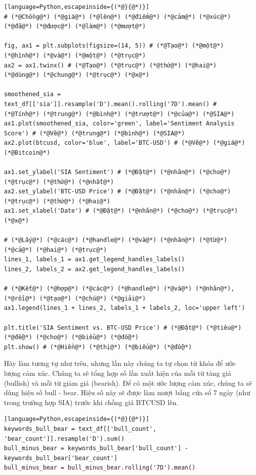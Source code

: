 \begin{lstlisting}[language=Python,escapeinside={(*@}{@*)}]
# (*@Chồng@*) (*@giá@*) (*@lên@*) (*@điểm@*) (*@cảm@*) (*@xúc@*) (*@đã@*) (*@được@*) (*@làm@*) (*@mượt@*)

fig, ax1 = plt.subplots(figsize=(14, 5)) # (*@Tạo@*) (*@một@*) (*@hình@*) (*@và@*) (*@một@*) (*@trục@*)
ax2 = ax1.twinx() # (*@Tạo@*) (*@trục@*) (*@thứ@*) (*@hai@*) (*@dùng@*) (*@chung@*) (*@trục@*) (*@x@*)

smoothened_sia = text_df[['sia']].resample('D').mean().rolling('7D').mean() # (*@Tính@*) (*@trung@*) (*@bình@*) (*@trượt@*) (*@của@*) (*@SIA@*)
ax1.plot(smoothened_sia, color='green', label='Sentiment Analysis Score') # (*@Vẽ@*) (*@trung@*) (*@bình@*) (*@SIA@*)
ax2.plot(btcusd, color='blue', label='BTC-USD') # (*@Vẽ@*) (*@giá@*) (*@Bitcoin@*)

ax1.set_ylabel('SIA Sentiment') # (*@Đặt@*) (*@nhãn@*) (*@cho@*) (*@trục@*) (*@thứ@*) (*@nhất@*)
ax2.set_ylabel('BTC-USD Price') # (*@Đặt@*) (*@nhãn@*) (*@cho@*) (*@trục@*) (*@thứ@*) (*@hai@*)
ax1.set_xlabel('Date') # (*@Đặt@*) (*@nhãn@*) (*@cho@*) (*@trục@*) (*@x@*)

# (*@Lấy@*) (*@các@*) (*@handle@*) (*@và@*) (*@nhãn@*) (*@từ@*) (*@cả@*) (*@hai@*) (*@trục@*)
lines_1, labels_1 = ax1.get_legend_handles_labels()
lines_2, labels_2 = ax2.get_legend_handles_labels()

# (*@Kết@*) (*@hợp@*) (*@các@*) (*@handle@*) (*@và@*) (*@nhãn@*), (*@rồi@*) (*@tạo@*) (*@chú@*) (*@giải@*)
ax1.legend(lines_1 + lines_2, labels_1 + labels_2, loc='upper left')

plt.title('SIA Sentiment vs. BTC-USD Price') # (*@Đặt@*) (*@tiêu@*) (*@đề@*) (*@cho@*) (*@biểu@*) (*@đồ@*)
plt.show() # (*@Hiển@*) (*@thị@*) (*@biểu@*) (*@đồ@*)
\end{lstlisting}

Hãy làm tương tự như trên, nhưng lần này chúng ta tự chọn từ khóa để ước lượng cảm xúc. Chúng ta sẽ tổng hợp số lần xuất hiện của mỗi từ tăng giá (bullish) và mỗi từ giảm giá (bearish). Để có một ước lượng cảm xúc, chúng ta sẽ dùng hiệu số bull - bear. Hiệu số này sẽ được làm mượt bằng cửa sổ 7 ngày (như trong trường hợp SIA) trước khi chồng giá BTCUSD lên.

\begin{lstlisting}[language=Python,escapeinside={(*@}{@*)}]
keywords_bull_bear = text_df[['bull_count', 'bear_count']].resample('D').sum()
bull_minus_bear = keywords_bull_bear['bull_count'] - keywords_bull_bear['bear_count']
bull_minus_bear = bull_minus_bear.rolling('7D').mean()
\end{lstlisting}

